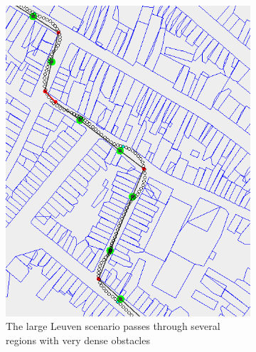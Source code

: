 \begin{figure}
\begin{subfigure}[t]{.45\textwidth}
        		\includegraphics[width=\textwidth]{img/leuven-dense-2}
        		\caption{The large Leuven scenario passes through several regions with very dense obstacles}
        		\label{fig:leuven-dense}
	\end{subfigure}	
	
        
    \caption{}\label{fig:perf-density}
\end{figure}



